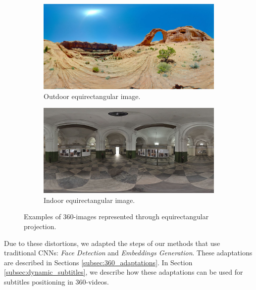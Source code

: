 \begin{figure}[!ht]
\centering
    \begin{subfigure}{0.47\linewidth}
        \centering
        \includegraphics[width=1\textwidth]{img/image (9).jpg}
        \caption{Outdoor equirectangular image.}
        \label{subfig:out_equi}
    \end{subfigure}\hfill
    \begin{subfigure}{0.47\linewidth}
        \centering
        \includegraphics[width=1\textwidth]{img/image (10).JPG}
        \caption{Indoor equirectangular image.}
        \label{subfig:in_equi}
    \end{subfigure}

\caption{Examples of 360-images represented through equirectangular projection.}
\label{fig:equirectangular_proj}
\end{figure}

Due to these distortions, we adapted the steps of our methods that use traditional CNNs: \emph{Face Detection} and \emph{Embeddings Generation}. These adaptations are described in Sections \ref{subsec:360_adaptations}. In Section \ref{subsec:dynamic_subtitles}, we describe how these adaptations can be used for subtitles positioning in 360-videos.

